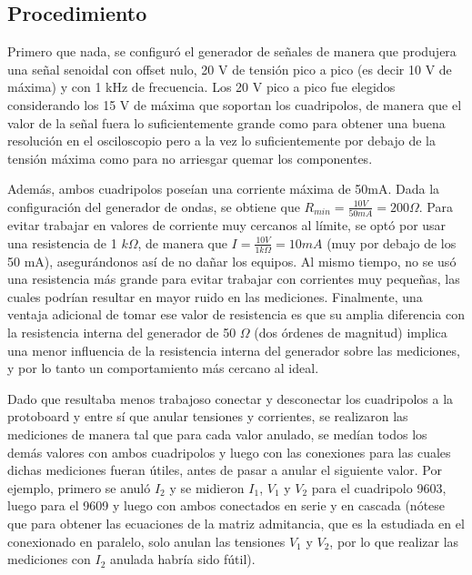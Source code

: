     \graphicspath{{imagenesFiguras/}} %

    \subsection{Procedimiento}
    
    Primero que nada, se configuró el generador de señales de manera que produjera una señal senoidal con offset nulo, 20 V de tensión
    pico a pico (es decir 10 V de máxima) y con 1 kHz de frecuencia. Los 20 V pico a pico fue elegidos considerando los 15 V de máxima
    que soportan los cuadripolos, de manera que el valor de la señal fuera lo suficientemente grande como para obtener una buena 
    resolución en el osciloscopio pero a la vez lo suficientemente por debajo de la tensión máxima como para no arriesgar quemar los
    componentes. 
    
    
    Además, ambos cuadripolos poseían una corriente máxima de 50mA. Dada la configuración del generador de ondas, se obtiene que  
    $R_{min} = \frac{10 V}{50 mA} = 200 \Omega$. Para evitar trabajar en valores de corriente muy cercanos al límite, se optó por
    usar una resistencia de 1 $k\Omega$, de manera que $ I = \frac{10 V}{1 k\Omega} = 10 mA $ (muy por debajo de los 50 mA), 
    asegurándonos así de no dañar los equipos. Al mismo tiempo, no se usó una resistencia más grande para evitar trabajar con
    corrientes muy pequeñas, las cuales podrían resultar en mayor ruido en las mediciones. Finalmente, una ventaja adicional de tomar
    ese valor de resistencia es que su amplia diferencia con la resistencia interna del generador de 50 $ \Omega $ (dos órdenes de
    magnitud) implica una menor influencia de la resistencia interna del generador sobre las mediciones, y por lo tanto un comportamiento
    más cercano al ideal.

    \par Dado que resultaba menos trabajoso conectar y desconectar los cuadripolos a la protoboard y entre sí que anular tensiones y
    corrientes, se realizaron las mediciones de manera tal que para cada valor anulado, se medían todos los demás valores con ambos
    cuadripolos y luego con las conexiones para las cuales dichas mediciones fueran útiles, antes de pasar a anular el siguiente valor.
    Por ejemplo, primero se anuló $ I_2 $ y se midieron $ I_1 $, $ V_1 $ y $ V_2 $ para el cuadripolo 9603, luego 
    para el 9609 y luego con ambos conectados en serie y en cascada (nótese que para obtener las ecuaciones de la matriz admitancia, 
    que es la estudiada en el conexionado en paralelo, solo anulan las tensiones $ V_1 $ y $ V_2 $, por lo que realizar las mediciones
    con $ I_2 $ anulada habría sido fútil).

